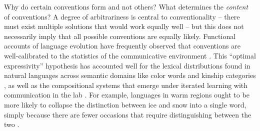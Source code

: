 
Why do certain conventions form and not others?
What determines the \emph{content} of conventions? 
A degree of arbitrariness is central to conventionality -- there must exist multiple solutions that would work equally well -- but this does not necessarily imply that all possible conventions are equally likely.
Functional accounts of language evolution have frequently observed that conventions are well-calibrated to the statistics of the communicative environment \cite{Gibson}.
This ``optimal expressivity'' hypothesis has accounted well for the lexical distributions found in natural languages across semantic domains like color words and kinship categories \cite{RegierKempKay15_WordMeaningsEfficientCommunication,GibsonEtAl17_ColorNamingUse}, as well as the compositional systems that emerge under iterated learning with communication in the lab \cite{WintersKirbySmith14_LanguagesAdapt, KirbyTamarizCornishSmith15_CompressionCommunication}. 
For example, languages in warm regions ought to be more likely to collapse the distinction between ice and snow into a single word, simply because there are fewer occasions that require distinguishing between the two \cite{RegierCarstensenKemp16_WordsForSnow}. 

